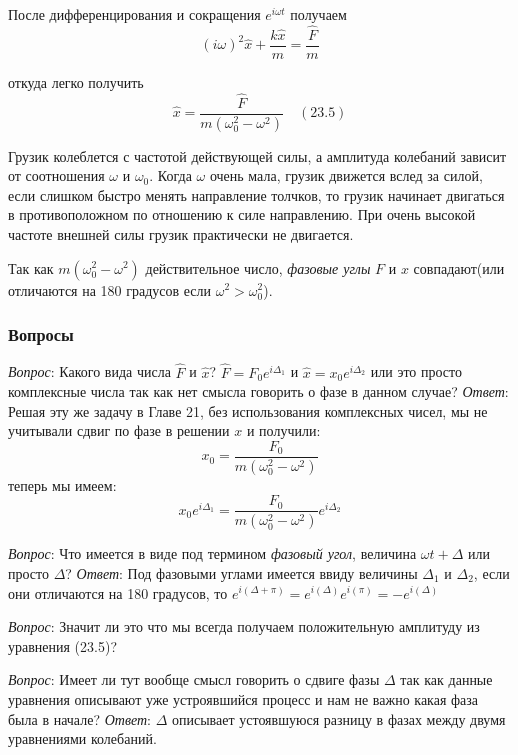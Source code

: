\documentclass[12pt]{article}
\begin{document}
После дифференцирования и сокращения $e^{i \omega t}$ получаем
\[
    (i \omega)^2 \hat{x} + \frac{k\hat{x}}{m} = \frac{\hat{F}}{m}
\]

откуда легко получить
\[
    \hat{x} = \frac{\hat{F}}{m(\omega_0^2-\omega^2)} \quad (23.5)
\]

\medskip

Грузик колеблется с частотой действующей силы, а амплитуда колебаний зависит от соотношения $\omega$ и $\omega_0$. Когда $\omega$ очень мала, грузик движется вслед за силой, если слишком быстро менять направление толчков, то грузик начинает двигаться в противоположном по отношению к силе направлению. При очень высокой частоте внешней силы грузик практически не двигается.

Так как $m(\omega_0^2-\omega^2)$ действительное число, \textit{фазовые углы} $F$ и $x$ совпадают(или отличаются на 180 градусов если $\omega^2 > \omega_0^2$).

\subsubsection{Вопросы}

\textit{Вопрос}: Какого вида числа $\hat{F}$ и $\hat{x}$? $\hat{F}=F_0 e^{i \Delta_1}$ и $\hat{x}=x_0 e^{i \Delta_2}$ или это просто комплексные числа так как нет смысла говорить о фазе в данном случае? \textit{Ответ}: Решая эту же задачу в Главе 21, без использования комплексных чисел, мы не учитывали сдвиг по фазе в решении \(x\) и получили:
\[
    x_0 = \frac{F_0}{m(\omega_0^2-\omega^2)}
\]
теперь мы имеем:
\[
    x_0 e^{i \Delta_1} = \frac{F_0}{m(\omega_0^2-\omega^2)} e^{i \Delta_2}
\]

\medskip

\textit{Вопрос}: Что имеется в виде под термином \textit{фазовый угол}, величина $\omega t+\Delta$ или просто $\Delta$? \textit{Ответ}: Под фазовыми углами имеется ввиду величины \(\Delta_1\) и \(\Delta_2\), если они отличаются на 180 градусов, то \(e^{i(\Delta+\pi)} = e^{i(\Delta)}e^{i(\pi)} = -e^{i(\Delta)}\)

\medskip

\textit{Вопрос}: Значит ли это что мы всегда получаем положительную амплитуду из уравнения (23.5)?

\medskip

\textit{Вопрос}: Имеет ли тут вообще смысл говорить о сдвиге фазы $\Delta$ так как данные уравнения описывают уже устроявшийся процесс и нам не важно какая фаза была в начале?
\textit{Ответ}: $\Delta$ описывает устоявшуюся разницу в фазах между двумя уравнениями колебаний.
\end{document}
